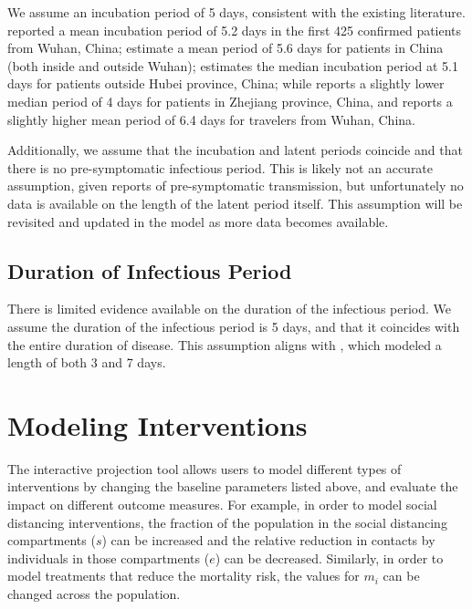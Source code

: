 \documentclass[12pt]{article}
\begin{document}
We assume an incubation period of 5 days, consistent with the existing literature. \citet{li_early_2020} reported a mean incubation period of 5.2 days in the first 425 confirmed patients from Wuhan, China; \citet{linton_2020} estimate a mean period of 5.6 days for patients in China (both inside and outside Wuhan); \citet{lauer_2020} estimates the median incubation period at 5.1 days for patients outside Hubei province, China; while \citet{xu_2020} reports a slightly lower median period of 4 days for patients in Zhejiang province, China, and \citet{backer_incubation_2020} reports a slightly higher mean period of 6.4 days for travelers from Wuhan, China.

Additionally, we assume that the incubation and latent periods coincide and that there is no pre-symptomatic infectious period. This is likely not an accurate assumption, given reports of pre-symptomatic transmission, but unfortunately no data is available on the length of the latent period itself. This assumption will be revisited and updated in the model as more data becomes available.

\subsection{Duration of Infectious Period}

There is limited evidence available on the duration of the infectious period. We assume the duration of the infectious period is 5 days, and that it coincides with the entire duration of disease. This assumption aligns with \citet{Prem2020}, which modeled a length of both 3 and  7 days.


\section{Modeling Interventions}

The interactive projection tool allows users to model different types of interventions by changing the baseline parameters listed above, and evaluate the impact on different outcome measures. For example, in order to model social distancing interventions, the fraction of the population in the social distancing compartments (\(s\)) can be increased and the relative reduction in contacts by individuals in those compartments (\(e\)) can be decreased. Similarly, in order to model treatments that reduce the mortality risk, the values for \(m_i\) can be changed across the population.

\setlength\bibsep{0pt}


\end{document}
